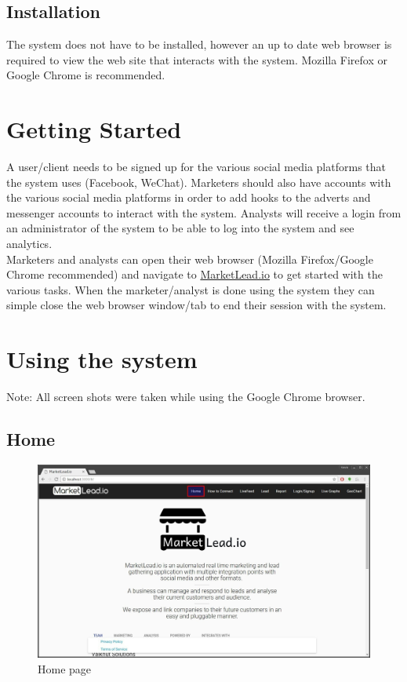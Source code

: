 \documentclass{article}
\begin{document}
		\subsection{Installation}
			The system does not have to be installed, however an up to date web browser is required to view the web site that interacts with the system. Mozilla Firefox or Google Chrome is recommended.

	\section{Getting Started}
		A user/client needs to be signed up for the various social media platforms that the system uses (Facebook, WeChat).
		Marketers should also have accounts with the various social media platforms in order to add hooks to the adverts and messenger accounts to interact with the system.
		Analysts will receive a login from an administrator of the system to be able to log into the system and see analytics.\\
		Marketers and analysts can open their web browser (Mozilla Firefox/Google Chrome recommended) and navigate to \href{https://marketlead.herokuapp.com}{MarketLead.io} to get started with the various tasks.
		When the marketer/analyst is done using the system they can simple close the web browser window/tab to end their session with the system.

	\section{Using the system}
		Note: All screen shots were taken while using the Google Chrome browser.
		\subsection{Home}
			\begin{figure}[H]
				\includegraphics[width=\textwidth]{images/home.jpg}
				\caption{Home page}
				\label{fig:home}
			\end{figure}
\end{document}
